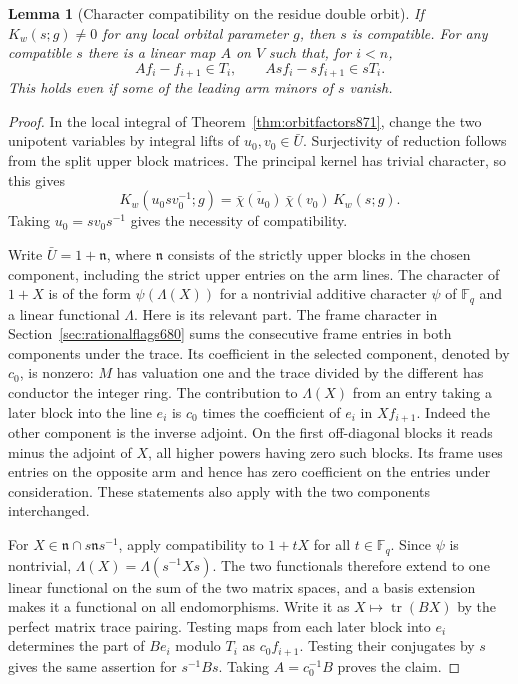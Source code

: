 \documentclass[a4paper,11pt]{article}
\newtheorem{lemma}[proposition]{Lemma}
\theoremstyle{definition}
\theoremstyle{remark}
\numberwithin{equation}{section}
\begin{document}
\begin{lemma}[Character compatibility on the residue double orbit]
\leavevmode\label{lem:residueshift878}
If \(K_w(s;g)\ne0\) for any local orbital parameter \(g\), then \(s\)
is compatible. For any compatible \(s\) there is a linear map \(A\)
on \(V\) such that, for \(i<n\),
\[
 A f_i-f_{i+1}\in T_i,\qquad A s f_i-s f_{i+1}\in sT_i .
\]
This holds even if some of the leading arm minors of \(s\) vanish.
\end{lemma}
\begin{proof}
In the local integral of Theorem~\ref{thm:orbitfactors871}, change
the two unipotent variables by integral lifts of \(u_0,v_0\in\bar U\).
Surjectivity of reduction follows from the split upper block matrices.
The principal kernel has trivial character, so this gives
\[
 K_w(u_0s v_0^{-1};g)
      =\overline{\bar\chi(u_0)}\,\bar\chi(v_0)\,K_w(s;g).
\]
Taking \(u_0=s v_0s^{-1}\) gives the necessity of compatibility.

Write \(\bar U=1+\mathfrak n\), where \(\mathfrak n\) consists of the
strictly upper blocks in the chosen component, including the strict
upper entries on the arm lines. The character of \(1+X\) is of the
form \(\psi(\Lambda(X))\) for a nontrivial additive character
\(\psi\) of \(\mathbb F_q\) and a linear functional \(\Lambda\).
Here is its relevant part. The frame character in
Section~\ref{sec:rationalflags680} sums the consecutive frame entries
in both components under the trace. Its coefficient in the selected
component, denoted by \(c_0\), is nonzero: \(M\) has valuation one
and the trace divided by the different has conductor the integer
ring. The contribution to \(\Lambda(X)\) from an entry taking a
later block into the line \(e_i\) is \(c_0\) times the coefficient
of \(e_i\) in \(X f_{i+1}\). Indeed the other component is the
inverse adjoint. On the first off-diagonal blocks it reads minus the
adjoint of \(X\), all higher powers having zero such blocks.
Its frame uses entries on the opposite arm and hence has zero
coefficient on the entries under consideration. These statements
also apply with the two components interchanged.

For \(X\in\mathfrak n\cap s\mathfrak n s^{-1}\), apply compatibility
to \(1+tX\) for all \(t\in\mathbb F_q\). Since \(\psi\) is nontrivial,
\(\Lambda(X)=\Lambda(s^{-1}Xs)\). The two functionals therefore
extend to one linear functional on the sum of the two matrix spaces,
and a basis extension makes it a functional on all endomorphisms.
Write it as \(X\mapsto\operatorname{tr}(BX)\) by the perfect matrix
trace pairing. Testing maps from each later block into \(e_i\)
determines the part of \(B e_i\) modulo \(T_i\) as \(c_0 f_{i+1}\).
Testing their conjugates by \(s\) gives the same assertion for
\(s^{-1}B s\). Taking \(A=c_0^{-1}B\) proves the claim.
\end{proof}
\end{document}
